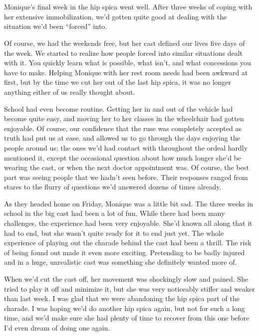 \chapter{}
Monique's final week in the hip spica went well. After three weeks of coping with her
extensive immobilization, we'd gotten quite good at dealing with the situation we'd been
``forced'' into.

Of course, we had the weekends free, but her cast defined our lives five days of the week.
We started to realize how people forced into similar situations dealt with it. You quickly learn
what is possible, what isn't, and what concessions you have to make. Helping Monique with her
rest room needs had been awkward at first, but by the time we cut her out of the last hip spica,
it was no longer anything either of us really thought about.

School had even become routine. Getting her in and out of the vehicle had become quite
easy, and moving her to her classes in the wheelchair had gotten enjoyable. Of course, our
confidence that the ruse was completely accepted as truth had put us at ease, and allowed us to
go through the days enjoying the people around us; the ones we'd had contact with throughout the
ordeal hardly mentioned it, except the occasional question about how much longer she'd be
wearing the cast, or when the next doctor appointment was. Of course, the best part was seeing
people that we hadn't seen before. Their responses ranged from stares to the flurry of questions
we'd answered dozens of times already.

\begin{thought}
As they headed home on Friday, Monique was a little bit sad. The three weeks in school in
the big cast had been a lot of fun. While there had been many challenges, the experience had
been very enjoyable. She'd known all along that it had to end, but she wasn't quite ready for it
to end just yet. The whole experience of playing out the charade behind the cast had been a
thrill. The risk of being found out made it even more exciting. Pretending to be badly injured
and in a huge, unrealistic cast was something she definitely wanted more of.
\end{thought}

When we'd cut the cast off, her movement was shockingly slow and pained. She tried to play
it off and minimize it, but she was very noticeably stiffer and weaker than last week. I was
glad that we were abandoning the hip spica part of the charade. I was hoping we'd do another hip
spica again, but not for such a long time, and we'd make sure she had plenty of time to recover
from this one before I'd even dream of doing one again.

